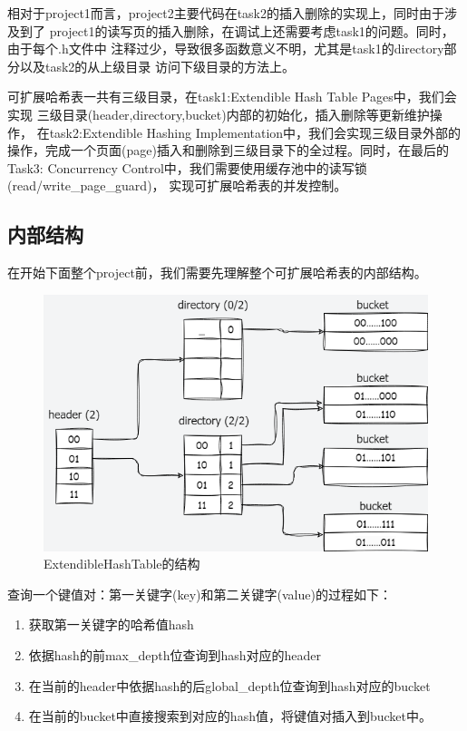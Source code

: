 \documentclass[a4paper]{article}
\begin{document}
相对于project1而言，project2主要代码在task2的插入删除的实现上，同时由于涉及到了
project1的读写页的插入删除，在调试上还需要考虑task1的问题。同时，由于每个.h文件中
注释过少，导致很多函数意义不明，尤其是task1的directory部分以及task2的从上级目录
访问下级目录的方法上。

可扩展哈希表一共有三级目录，在task1:Extendible Hash Table Pages中，我们会实现
三级目录(header,directory,bucket)内部的初始化，插入删除等更新维护操作，
在task2:Extendible Hashing Implementation中，我们会实现三级目录外部的
操作，完成一个页面(page)插入和删除到三级目录下的全过程。同时，在最后的Task3:
Concurrency Control中，我们需要使用缓存池中的读写锁(read/write\_page\_guard)，
实现可扩展哈希表的并发控制。

\subsection{内部结构}

在开始下面整个project前，我们需要先理解整个可扩展哈希表的内部结构。

\begin{figure}[h!]
   \centering
   \includegraphics[scale=1]{1.png}
   \caption{ExtendibleHashTable的结构}
   \label{fig:1}
\end{figure}

查询一个键值对：第一关键字(key)和第二关键字(value)的过程如下：

\begin{enumerate}
   \item 获取第一关键字的哈希值hash
   \item 依据hash的前max\_depth位查询到hash对应的header
   \item 在当前的header中依据hash的后global\_depth位查询到hash对应的bucket
   \item 在当前的bucket中直接搜索到对应的hash值，将键值对插入到bucket中。
\end{enumerate}
\end{document}
